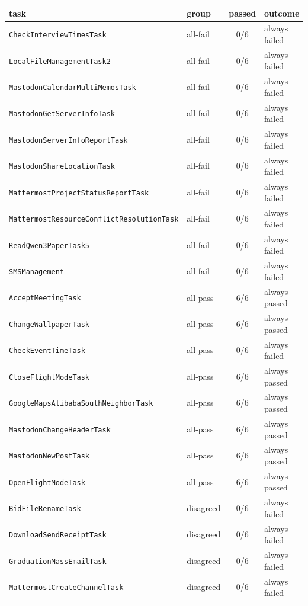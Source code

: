 \begin{tabular}{llcl}
\toprule
task & group & passed & outcome \\
\midrule
\texttt{CheckInterviewTimesTask} & all-fail & 0/6 & always failed \\
\texttt{LocalFileManagementTask2} & all-fail & 0/6 & always failed \\
\texttt{MastodonCalendarMultiMemosTask} & all-fail & 0/6 & always failed \\
\texttt{MastodonGetServerInfoTask} & all-fail & 0/6 & always failed \\
\texttt{MastodonServerInfoReportTask} & all-fail & 0/6 & always failed \\
\texttt{MastodonShareLocationTask} & all-fail & 0/6 & always failed \\
\texttt{MattermostProjectStatusReportTask} & all-fail & 0/6 & always failed \\
\texttt{MattermostResourceConflictResolutionTask} & all-fail & 0/6 & always failed \\
\texttt{ReadQwen3PaperTask5} & all-fail & 0/6 & always failed \\
\texttt{SMSManagement} & all-fail & 0/6 & always failed \\
\texttt{AcceptMeetingTask} & all-pass & 6/6 & always passed \\
\texttt{ChangeWallpaperTask} & all-pass & 6/6 & always passed \\
\texttt{CheckEventTimeTask} & all-pass & 0/6 & always failed \\
\texttt{CloseFlightModeTask} & all-pass & 6/6 & always passed \\
\texttt{GoogleMapsAlibabaSouthNeighborTask} & all-pass & 6/6 & always passed \\
\texttt{MastodonChangeHeaderTask} & all-pass & 6/6 & always passed \\
\texttt{MastodonNewPostTask} & all-pass & 6/6 & always passed \\
\texttt{OpenFlightModeTask} & all-pass & 6/6 & always passed \\
\texttt{BidFileRenameTask} & disagreed & 0/6 & always failed \\
\texttt{DownloadSendReceiptTask} & disagreed & 0/6 & always failed \\
\texttt{GraduationMassEmailTask} & disagreed & 0/6 & always failed \\
\texttt{MattermostCreateChannelTask} & disagreed & 0/6 & always failed \\
\bottomrule
\end{tabular}
